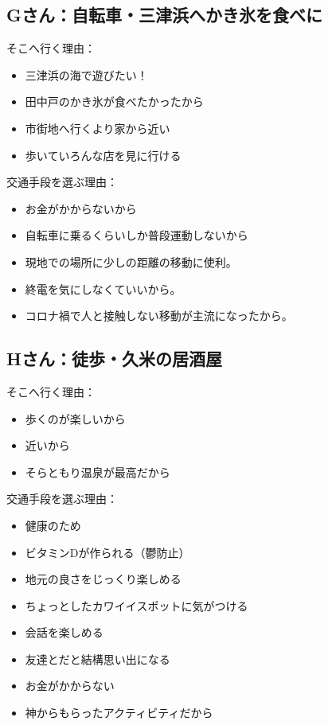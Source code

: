 \documentclass[a4paper,12pt, uplatex]{jsbook}
\begin{document}
\subsection{Gさん：自転車・三津浜へかき氷を食べに}
そこへ行く理由：
\begin{itemize}
  \item 三津浜の海で遊びたい！
  \item 田中戸のかき氷が食べたかったから
  \item 市街地へ行くより家から近い
  \item 歩いていろんな店を見に行ける
\end{itemize}

交通手段を選ぶ理由：
\begin{itemize}
  \item お金がかからないから
  \item 自転車に乗るくらいしか普段運動しないから
  \item 現地での場所に少しの距離の移動に使利。
  \item 終電を気にしなくていいから。
  \item コロナ禍で人と接触しない移動が主流になったから。
\end{itemize}


\subsection{Hさん：徒歩・久米の居酒屋}
そこへ行く理由：
\begin{itemize}
  \item 歩くのが楽しいから
  \item 近いから
  \item そらともり温泉が最高だから
\end{itemize}

交通手段を選ぶ理由：
\begin{itemize}
  \item 健康のため
  \item ビタミンDが作られる（鬱防止）
  \item 地元の良さをじっくり楽しめる
  \item ちょっとしたカワイイスポットに気がつける
  \item 会話を楽しめる
  \item 友達とだと結構思い出になる
  \item お金がかからない
  \item 神からもらったアクティビティだから
\end{itemize}
\end{document}
